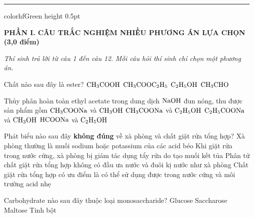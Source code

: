 \documentclass[11pt,a4paper]{article}
\begin{document}
\vspace{4pt}
\hrule color{hfGreen} height 0.5pt

\vspace{6pt}
\noindent
{\color{mainGreen}\textbf{\large PHẦN I. CÂU TRẮC NGHIỆM NHIỀU PHƯƠNG ÁN LỰA CHỌN (3,0 điểm)}}

\textit{Thí sinh trả lời từ câu 1 đến câu 12. Mỗi câu hỏi thí sinh chỉ chọn một phương án.}

\vspace{2pt}

\begin{ex}
Chất nào sau đây là ester?
\choice
{$\ce{CH3COOH}$}
{\True $\ce{CH3COOC2H5}$}
{$\ce{C2H5OH}$}
{$\ce{CH3CHO}$}

\end{ex}
\begin{ex}
Thủy phân hoàn toàn ethyl acetate trong dung dịch $\ce{NaOH}$ đun nóng, thu được sản phẩm gồm
\choice
{$\ce{CH3COONa}$ và $\ce{CH3OH}$}
{\True $\ce{CH3COONa}$ và $\ce{C2H5OH}$}
{$\ce{C2H5COONa}$ và $\ce{CH3OH}$}
{$\ce{HCOONa}$ và $\ce{C2H5OH}$}

\end{ex}
\begin{ex}
Phát biểu nào sau đây \textbf{không đúng} về xà phòng và chất giặt rửa tổng hợp?
\choice
{Xà phòng thường là muối sodium hoặc potassium của các acid béo}
{Khi giặt rửa trong nước cứng, xà phòng bị giảm tác dụng tẩy rửa do tạo muối kết tủa}
{\True Phân tử chất giặt rửa tổng hợp không có đầu ưa nước và đuôi kị nước như xà phòng}
{Chất giặt rửa tổng hợp có ưu điểm là có thể sử dụng được trong nước cứng và môi trường acid nhẹ}

\end{ex}
\begin{ex}
Carbohydrate nào sau đây thuộc loại monosaccharide?
\choice
{\True Glucose}
{Saccharose}
{Maltose}
{Tinh bột}

\end{ex}
\end{document}
